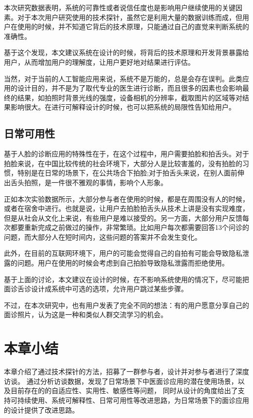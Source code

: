 本次研究数据表明，系统的可靠性或者说信任度也是影响用户继续使用的关键因素。对于本次用户研究使用的技术探针，虽然它是利用大量的数据训练而成，但用户在使用的时候，并不知道它背后的技术原理，只能通过自己的直觉来判断系统的准确性。

基于这个发现，本文建议系统在设计的时候，将背后的技术原理和开发背景暴露给用户，从而增加用户的理解度，让用户更好地对结果进行评估。

当然，对于当前的人工智能应用来说，系统不是万能的，总是会存在误判。此类应用的设计目的，并不是为了取代专业的医生进行诊断，而且很多的因素也会影响最终的结果，如拍照时背景光线的强度，设备相机的分辨率，截取图片的区域等对结果影响很大。在进行可解释设计的时候，也可以把系统的局限性告知给用户。

\subsection{日常可用性}
基于人脸的诊断应用的特殊性在于，在这个过程中，用户需要拍脸和拍舌头。对于拍脸来说，在中国比较传统的社会环境下，大部分人是比较害羞的，没有拍脸的习惯，特别是在日常的场景下，在公共场合下拍脸;对于拍舌头来说，在别人面前伸出舌头拍照，是一件很不雅观的事情，影响个人形象。

正如本次实验数据所示，大部分参与者在使用的时候，都是在周围没有人的时候，或者在宿舍中进行。也就是说，让用户去拍脸拍舌头从技术上讲是没有实现难度，但是从社会从文化上来说，有些用户是难以接受的。另一方面，大部分用户反馈每次都要重新完成之前做过的操作，非常繁琐。比如用户每次都需要回答13个问诊的问题，而大部分人在短时间内，这些问题的答案并不会发生变化。

此外，在目前的互联网环境下，用户的可能会觉得自己的自拍有可能会导致隐私泄露的问题。用户在使用的时候会考虑到自己拍脸导致隐私泄露而拒绝使用。

基于上面的讨论，本文建议在设计的时候，在不影响系统使用的情况下，尽可能把面诊舌诊设计成系统中可选的选项，允许用户跳过某些步骤。

不过，在本次研究中，也有用户发表了完全不同的想法：有的用户愿意分享自己的面诊照片，认为这是一种和类似人群交流学习的机会。

\section{本章小结}

本章介绍了通过技术探针的方法，招募了一群参与者，设计并对参与者进行了深度访谈。
通过分析访谈数据，发现了日常场景下中医面诊应用的潜在使用场景，以及目前存在的的自适应性、实用性、敏感性等问题，
同时从设计的角度给出了支持可持续使用、系统可解释性、日常可用性等改进思路，为日常场景下的面诊应用的设计提供了改进思路。


